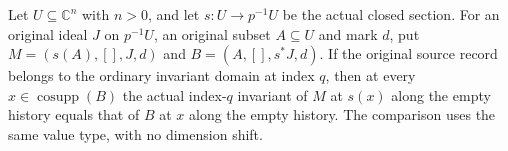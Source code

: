 \begin{theorem}
\label{hir:actual-closed-section-all-index-initial-values}
\leanok
Let $U\subseteq\mathbb C^n$ with $n>0$, and let $s:U\to p^{-1}U$ be the actual
closed section. For an original ideal $J$ on $p^{-1}U$, an original subset
$A\subseteq U$ and mark $d$, put $M=(s(A),[],J,d)$ and
$B=(A,[],s^*J,d)$. If the original source record belongs to the ordinary invariant
domain at index $q$, then at every $x\in\operatorname{cosupp}(B)$ the actual index-$q$ invariant of
$M$ at $s(x)$ along the empty history equals that of $B$ at $x$ along the empty
history. The comparison uses the same value type, with no dimension shift.
\end{theorem}
